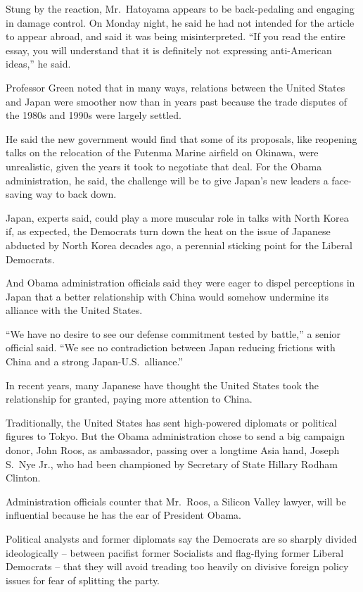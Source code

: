 ﻿\documentclass[12pt]{article}
\begin{document}
Stung by the reaction, Mr.~Hatoyama appears to be back-pedaling and engaging in damage control. On
Monday night, he said he had not intended for the article to appear abroad, and said it was being
misinterpreted. ``If you read the entire essay, you will understand that it is definitely not
expressing anti-American ideas,'' he said.

Professor Green noted that in many ways, relations between the United States and Japan were smoother
now than in years past because the trade disputes of the 1980s and 1990s were largely settled.

He said the new government would find that some of its proposals, like reopening talks on the
relocation of the Futenma Marine airfield on Okinawa, were unrealistic, given the years it took to
negotiate that deal. For the Obama administration, he said, the challenge will be to give Japan's
new leaders a face-saving way to back down.

Japan, experts said, could play a more muscular role in talks with North Korea if, as expected, the
Democrats turn down the heat on the issue of Japanese abducted by North Korea decades ago, a
perennial\cite{perennial} sticking point for the Liberal Democrats.

And Obama administration officials said they were eager to dispel\cite{dispel} perceptions in Japan
that a better relationship with China would somehow undermine its alliance with the United States.

``We have no desire to see our defense commitment tested by battle,'' a senior official said. ``We
see no contradiction between Japan reducing frictions with China and a strong Japan-U.S.~alliance.''

In recent years, many Japanese have thought the United States took the relationship for granted,
paying more attention to China.

Traditionally, the United States has sent high-powered diplomats or political figures to Tokyo. But
the Obama administration chose to send a big campaign donor, John Roos, as ambassador, passing over
a longtime Asia hand, Joseph S.~Nye Jr., who had been championed by Secretary of State Hillary
Rodham Clinton.

Administration officials counter that Mr.~Roos, a Silicon Valley lawyer, will be influential because
he has the ear of President Obama.

Political analysts and former diplomats say the Democrats are so sharply divided ideologically --
between pacifist former Socialists and flag-flying former Liberal Democrats -- that they will avoid
treading too heavily on divisive foreign policy issues for fear of splitting the party.
\end{document}
